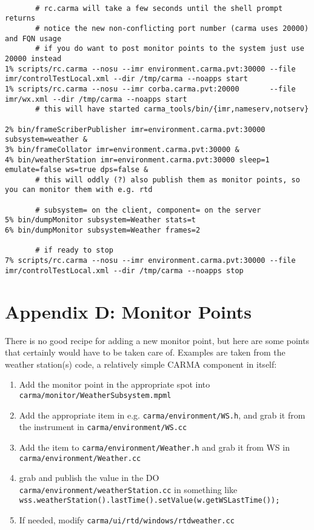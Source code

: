 \documentclass[11pt]{article}
\begin{document}
\footnotesize
\begin{verbatim}

       # rc.carma will take a few seconds until the shell prompt returns
       # notice the new non-conflicting port number (carma uses 20000) and FQN usage
       # if you do want to post monitor points to the system just use 20000 instead
1% scripts/rc.carma --nosu --imr environment.carma.pvt:30000 --file imr/controlTestLocal.xml --dir /tmp/carma --noapps start
1% scripts/rc.carma --nosu --imr corba.carma.pvt:20000       --file imr/wx.xml --dir /tmp/carma --noapps start
       # this will have started carma_tools/bin/{imr,nameserv,notserv}

2% bin/frameScriberPublisher imr=environment.carma.pvt:30000 subsystem=weather &
3% bin/frameCollator imr=environment.carma.pvt:30000 &
4% bin/weatherStation imr=environment.carma.pvt:30000 sleep=1 emulate=false ws=true dps=false &
       # this will oddly (?) also publish them as monitor points, so you can monitor them with e.g. rtd

       # subsystem= on the client, component= on the server
5% bin/dumpMonitor subsystem=Weather stats=t
6% bin/dumpMonitor subsystem=Weather frames=2

       # if ready to stop
7% scripts/rc.carma --nosu --imr environment.carma.pvt:30000 --file imr/controlTestLocal.xml --dir /tmp/carma --noapps stop

\end{verbatim}
\footnotesize

\section{Appendix D: Monitor Points}

There is no good recipe for adding a new monitor point, but here are some points that certainly would
have to be taken care of. Examples are taken from the weather station(s) code, a relatively simple
CARMA component in itself:

\begin{enumerate}

\item
Add the monitor point in the appropriate spot into {\tt carma/monitor/WeatherSubsystem.mpml}

\item
Add the appropriate item in e.g. {\tt carma/environment/WS.h}, and grab it from the instrument
in {\tt carma/environment/WS.cc}

\item
Add the item to {\tt carma/environment/Weather.h} and grab it from WS in
{\tt carma/environment/Weather.cc}

\item
grab and publish the value in the DO {\tt  carma/environment/weatherStation.cc} in
something like
{\tt  wss.weatherStation().lastTime().setValue(w.getWSLastTime());}

\item
If needed, modify {\tt carma/ui/rtd/windows/rtdweather.cc}

\end{enumerate}
\end{document}
